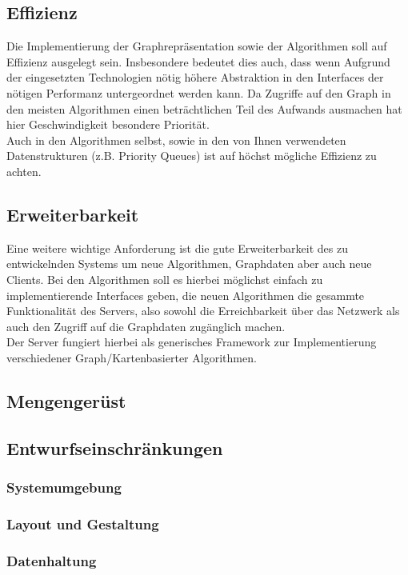 \documentclass[a4paper,10pt,titlepage]{article}
\begin{document}
\subsection{Effizienz}
Die Implementierung der Graphrepräsentation sowie der Algorithmen soll auf Effizienz ausgelegt sein.
Insbesondere bedeutet dies auch, dass wenn Aufgrund der eingesetzten Technologien nötig höhere Abstraktion in den Interfaces der nötigen Performanz
untergeordnet werden kann. Da Zugriffe auf den Graph in den meisten Algorithmen einen beträchtlichen Teil des Aufwands ausmachen hat hier
Geschwindigkeit besondere Priorität.\\
Auch in den Algorithmen selbst, sowie in den von Ihnen verwendeten Datenstrukturen (z.B. Priority Queues) ist auf höchst mögliche Effizienz zu achten.
\subsection{Erweiterbarkeit}
Eine weitere wichtige Anforderung ist die gute Erweiterbarkeit des zu entwickelnden Systems um neue Algorithmen, Graphdaten aber auch neue Clients.
Bei den Algorithmen soll es hierbei möglichst einfach zu implementierende Interfaces geben, die neuen Algorithmen die gesammte Funktionalität des Servers,
also sowohl die Erreichbarkeit über das Netzwerk als auch den Zugriff auf die Graphdaten zugänglich machen.\\
Der Server fungiert hierbei als generisches Framework zur Implementierung verschiedener Graph/Kartenbasierter Algorithmen.
\subsection{Mengengerüst}
\label{Mengengeruest}

\subsection{Entwurfseinschränkungen}
\subsubsection{Systemumgebung}

\subsubsection{Layout und Gestaltung}

\subsubsection{Datenhaltung}
\label{datenhaltung}
\end{document}
